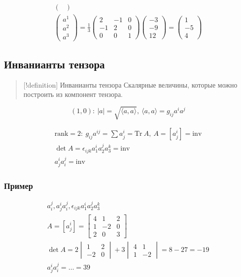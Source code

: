 $$\begin{gather}
\begin{pmatrix}
\end{pmatrix} \\
\begin{pmatrix}
a^{1} \\
a^{2} \\
a^{3}
\end{pmatrix} = \frac{1}{3}\begin{pmatrix}
2 & -1 & 0 \\
-1 & 2 & 0 \\
0 & 0 & 1
\end{pmatrix}\begin{pmatrix}
-3 \\
-9 \\
12
\end{pmatrix} = \begin{pmatrix}
1 \\
-5 \\
4
\end{pmatrix}
\end{gather}$$

\subsection{Инванианты
тензора}

\begin{quote}
{[}!definition{]} Инванианты тензора Скалярные величины, которые можно
построить из компонент тензора.
\end{quote}

$$(1,0): \ |a| = \sqrt{ \langle a, a \rangle }, \ \langle a,a \rangle = g_{ij}a^{i}a^{j}$$

$$\begin{gather}
\mathrm{rank} = 2: \ g_{ij}a^{ij} = \sum a^{i}_{j} = \mathrm{Tr} \ A, \ A = [a_{j}^{i}] = \mathrm{inv} \\
\det A = \epsilon_{ijk}a_{1}^{i}a_{2}^{j}a_{3}^{k} = \mathrm{inv} \\
a^{i}_{j}a^{j}_{i} = \mathrm{inv}
\end{gather}$$

\subsubsection{Пример}

$$\begin{gather}
a_{i}^{j}, a_{j}^{i}a_{i}^{j}, \epsilon_{ijk}a_{1}^{i}a_{2}^{j}a_{3}^{k} \\
A = [a_{j}^{i}] = \begin{bmatrix}
4 & 1 & 2 \\
1 & -2 & 0 \\
2 & 0 & 3
\end{bmatrix} \\
\det A = 2\begin{vmatrix}
1 & 2 \\
-2 & 0
\end{vmatrix} + 3\begin{vmatrix}
4 & 1 \\
1 & -2
\end{vmatrix} = 8-27 = -19 \\
a^{i}_{j}a_{i}^{j} = \dots = 39
\end{gather}$$

